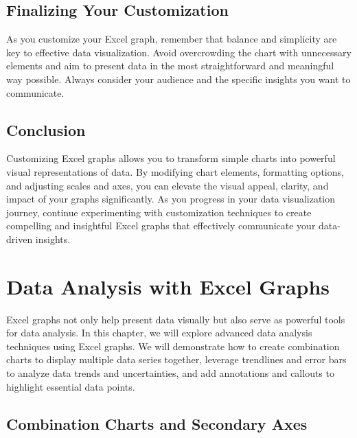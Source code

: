 \documentclass[
]{book}
\begin{document}
\hypertarget{finalizing-your-customization}{%
\section{Finalizing Your Customization}\label{finalizing-your-customization}}

As you customize your Excel graph, remember that balance and simplicity are key to effective data visualization. Avoid overcrowding the chart with unnecessary elements and aim to present data in the most straightforward and meaningful way possible. Always consider your audience and the specific insights you want to communicate.

\hypertarget{conclusion-2}{%
\section{Conclusion}\label{conclusion-2}}

Customizing Excel graphs allows you to transform simple charts into powerful visual representations of data. By modifying chart elements, formatting options, and adjusting scales and axes, you can elevate the visual appeal, clarity, and impact of your graphs significantly. As you progress in your data visualization journey, continue experimenting with customization techniques to create compelling and insightful Excel graphs that effectively communicate your data-driven insights.

\hypertarget{data-analysis-with-excel-graphs}{%
\chapter{Data Analysis with Excel Graphs}\label{data-analysis-with-excel-graphs}}

Excel graphs not only help present data visually but also serve as powerful tools for data analysis. In this chapter, we will explore advanced data analysis techniques using Excel graphs. We will demonstrate how to create combination charts to display multiple data series together, leverage trendlines and error bars to analyze data trends and uncertainties, and add annotations and callouts to highlight essential data points.

\hypertarget{combination-charts-and-secondary-axes}{%
\section{Combination Charts and Secondary Axes}\label{combination-charts-and-secondary-axes}}
\end{document}
